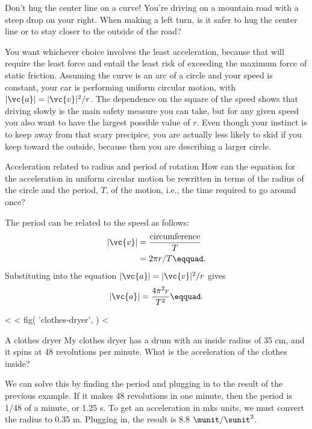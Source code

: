 \begin{eg}{Don't hug the center line on a curve!}
\egquestion You're driving on a mountain road with a steep
drop on your right. When making a left turn, is it safer to
hug the center line or to stay closer to the outside of the road?

\eganswer You want whichever choice involves the least
acceleration, because that will require the least force and
entail the least risk of exceeding the maximum force of
static friction. Assuming the curve is an arc of a circle
and your speed is constant, your car is performing uniform
circular motion, with $|\vc{a}|=|\vc{v}|^2/r$. The dependence on the
square of the speed shows that driving slowly is the main
safety measure you can take, but for any given speed you
also want to have the largest possible value of $r$. Even
though your instinct is to keep away from that scary
precipice, you are actually less likely to skid if you keep
toward the outside, because then you are describing a larger circle.
\end{eg}

\begin{eg}{Acceleration related to radius and period of rotation}\label{eg:accel-rt}
\egquestion How can the equation for the acceleration in
uniform circular motion be rewritten in terms of the radius
of the circle and the period, $T$, of the motion, i.e., the time required to go around once?

\eganswer The period can be related to the speed as follows:
\begin{align*}
        |\vc{v}|     &=  \frac{\text{circumference}}{T}  \\
             &=  2\pi r/T\eqquad.
\end{align*}
Substituting into the equation $|\vc{a}|=|\vc{v}|^2/r$ gives
\begin{equation*}
        |\vc{a}|     =    \frac{4\pi^2r}{T^2}\eqquad.
\end{equation*}
\end{eg}

<%
<%
  fig(
    'clothes-dryer',
  )
<%

\begin{eg}{A clothes dryer}\label{eg:clothes-dryer}
\egquestion My clothes dryer has a drum with an inside radius
of 35 cm, and it spins at 48 revolutions per minute. What is
the acceleration of the clothes inside?

\eganswer We can solve this by finding the period and
plugging in to the result of the previous example. If it
makes 48 revolutions in one minute, then the period is 1/48
of a minute, or 1.25 s. To get an acceleration in mks
units, we must convert the radius to 0.35 m. Plugging in,
the result is 8.8 $\munit/\sunit^2$.
\end{eg}

